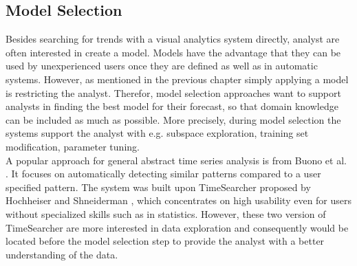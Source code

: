 \documentclass[electronic]{vgtc}             %
\begin{document}
\subsection{Model Selection\label{subsec:selection}}
Besides searching for trends with a visual analytics system directly, analyst are often interested in create a model. 
Models have the advantage that they can be used by unexperienced users once they are defined as well as in automatic systems. 
However, as mentioned in the previous chapter simply applying a model is restricting the analyst. 
Therefor, model selection approaches want to support analysts in finding the best model for their forecast, so that domain knowledge can be included as much as possible. 
More precisely, during model selection the systems support the analyst with e.g. subspace exploration, training set modification, parameter tuning. \cite{Lu:2017}\\
A popular approach for general abstract time series analysis is from Buono et al. \cite{buono:2005}.
It focuses on automatically detecting similar patterns compared to a user specified pattern.
The system was built upon TimeSearcher proposed by Hochheiser and Shneiderman \cite{Hochheiser:2004}, which concentrates on high usability even for users without specialized skills such as in statistics.
However, these two version of TimeSearcher are more interested in data exploration and consequently would be located before the model selection step to provide the analyst with a better understanding of the data. 
\end{document}

